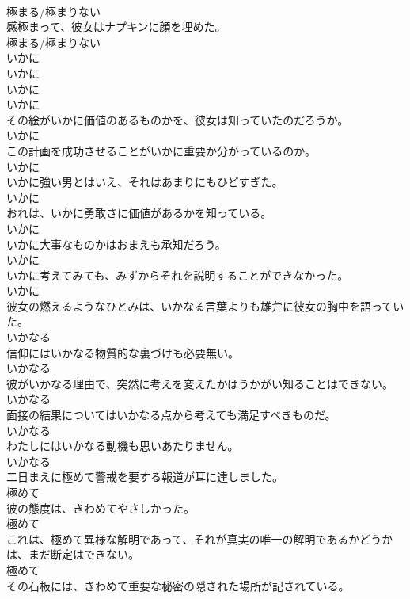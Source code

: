 \documentclass[8pt]{extreport}
\begin{document}
\begin{CJK}{UTF8}{min}
\\	極まる/極まりない	
\\	感極まって、彼女はナプキンに顔を埋めた。	
\\	極まる/極まりない	
\\	いかに 
\\	いかに 
\\	いかに 
\\	いかに	
\\	その絵がいかに価値のあるものかを、彼女は知っていたのだろうか。	
\\	いかに	
\\	この計画を成功させることがいかに重要か分かっているのか。	
\\	いかに	
\\	いかに強い男とはいえ、それはあまりにもひどすぎた。	
\\	いかに	
\\	おれは、いかに勇敢さに価値があるかを知っている。	
\\	いかに	
\\	いかに大事なものかはおまえも承知だろう。	
\\	いかに	
\\	いかに考えてみても、みずからそれを説明することができなかった。	
\\	いかに	
\\	彼女の燃えるようなひとみは、いかなる言葉よりも雄弁に彼女の胸中を語っていた。	
\\	いかなる	
\\	信仰にはいかなる物質的な裏づけも必要無い。	
\\	いかなる	
\\	彼がいかなる理由で、突然に考えを変えたかはうかがい知ることはできない。	
\\	いかなる	
\\	面接の結果についてはいかなる点から考えても満足すべきものだ。	
\\	いかなる	
\\	わたしにはいかなる動機も思いあたりません。	
\\	いかなる	
\\	二日まえに極めて警戒を要する報道が耳に達しました。	
\\	極めて	
\\	彼の態度は、きわめてやさしかった。	
\\	極めて	
\\	これは、極めて異様な解明であって、それが真実の唯一の解明であるかどうかは、まだ断定はできない。	
\\	極めて	
\\	その石板には、きわめて重要な秘密の隠された場所が記されている。	

\end{CJK}
\end{document}
